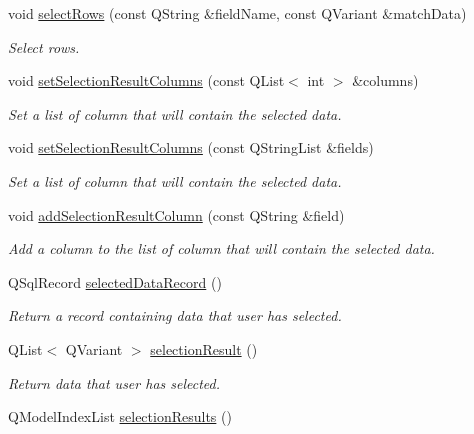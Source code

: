 \begin{DoxyCompactItemize}
void \hyperlink{classmdt_sql_selection_dialog_ad28449f5ab1b3ad4fdbdf3f5a0fbb456}{select\-Rows} (const Q\-String \&field\-Name, const Q\-Variant \&match\-Data)
\begin{DoxyCompactList}\small\item\em Select rows. \end{DoxyCompactList}\item 
void \hyperlink{classmdt_sql_selection_dialog_a88311778de191bf78e351ea4370b9a6d}{set\-Selection\-Result\-Columns} (const Q\-List$<$ int $>$ \&columns)
\begin{DoxyCompactList}\small\item\em Set a list of column that will contain the selected data. \end{DoxyCompactList}\item 
void \hyperlink{classmdt_sql_selection_dialog_a5c5c36414bf3c432979f53ad27f985cb}{set\-Selection\-Result\-Columns} (const Q\-String\-List \&fields)
\begin{DoxyCompactList}\small\item\em Set a list of column that will contain the selected data. \end{DoxyCompactList}\item 
void \hyperlink{classmdt_sql_selection_dialog_ae5582bd717078a137dd71d5a1b9cc9f9}{add\-Selection\-Result\-Column} (const Q\-String \&field)
\begin{DoxyCompactList}\small\item\em Add a column to the list of column that will contain the selected data. \end{DoxyCompactList}\item 
Q\-Sql\-Record \hyperlink{classmdt_sql_selection_dialog_affdf9a9936509c8b6ca141b8ff415995}{selected\-Data\-Record} ()
\begin{DoxyCompactList}\small\item\em Return a record containing data that user has selected. \end{DoxyCompactList}\item 
Q\-List$<$ Q\-Variant $>$ \hyperlink{classmdt_sql_selection_dialog_a23592c799f3b8945b3f5e72082dc265b}{selection\-Result} ()
\begin{DoxyCompactList}\small\item\em Return data that user has selected. \end{DoxyCompactList}\item 
Q\-Model\-Index\-List \hyperlink{classmdt_sql_selection_dialog_a85b7c1e3e156c141315d0873fa36d4b3}{selection\-Results} ()

\end{DoxyCompactItemize}
